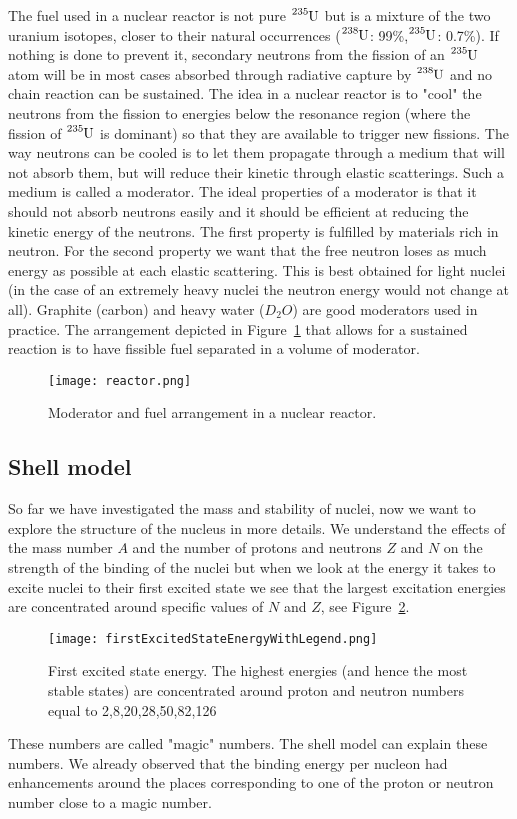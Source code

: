 \documentclass[12pt]{article}
\begin{document}
The fuel used in a nuclear reactor is not pure $\ce{^{235}U}$ but is a mixture of the two uranium isotopes, closer to their natural occurrences ($\ce{^{238}U}$: 99\%,$\ce{^{235}U}$: 0.7\%). If nothing is done to prevent it, secondary neutrons from the fission of an $\ce{^{235}U}$ atom will be in most cases absorbed through radiative capture by $\ce{^{238}U}$ and no chain reaction can be sustained. The idea in a nuclear reactor is to "cool" the neutrons from the fission to energies below the resonance region (where the fission of $\ce{^{235}U}$ is dominant) so that they are available to trigger new fissions. The way neutrons can be cooled is to let them propagate through a medium that will not absorb them, but will reduce their kinetic through elastic scatterings. Such a medium is called a moderator. The ideal properties of a moderator is that it should not absorb neutrons easily and it should be efficient at reducing the kinetic energy of the neutrons. The first property is fulfilled by materials rich in neutron. For the second property we want that the free neutron loses as much energy as possible at each elastic scattering. This is best obtained for light nuclei (in the case of an extremely heavy nuclei the neutron energy would not change at all). Graphite (carbon) and heavy water ($D_2O$) are good moderators used in practice. The arrangement depicted in Figure~\ref{fig:reactor} that allows for a sustained reaction is to have fissible fuel separated in a volume of moderator.       
\begin{figure}
\begin{center}
\texttt{[image: reactor.png]}   
\end{center}
\caption{Moderator and fuel arrangement in a nuclear reactor.}\label{fig:reactor}
\end{figure} 
\clearpage
%
%
%
\subsection{Shell model}
%
%
%
So far we have investigated the mass and stability of nuclei, now we want to explore the structure of the nucleus in more details. We understand the effects of the mass number $A$ and the number of protons and neutrons $Z$ and $N$ on the strength of the binding of the nuclei but when we look at the energy it takes to excite nuclei to their first excited state we see that the largest excitation energies are concentrated around specific values of $N$ and $Z$, see Figure~\ref{fig:firstExcited}.  
\begin{figure}
\begin{center}
\texttt{[image: firstExcitedStateEnergyWithLegend.png]}
\end{center}
\caption{First excited state energy. The highest energies (and hence the most stable states) are concentrated around proton and neutron numbers equal to 2,8,20,28,50,82,126}\label{fig:firstExcited}
\end{figure}
These numbers are called "magic" numbers. The shell model can explain these numbers. We already observed that the binding energy per nucleon had enhancements around the places corresponding to one of the proton or neutron number close to a magic number.
\end{document}
